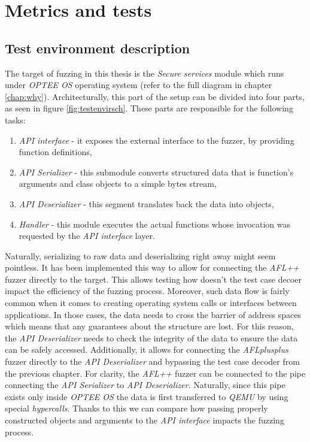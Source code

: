 \cleardoublepage
\section{Metrics and tests} \label{chap:tests}

\subsection{Test environment description}

The target of fuzzing in this thesis is the \textit{Secure services} module which runs under \textit{OPTEE OS} operating system (refer to the full diagram in chapter \ref{chap:why}). Architecturally, this part of the setup can be divided into four parts, as seen in figure \ref{fig:testenvirsch}. These parts are responsible for the following tasks:
\begin{enumerate}
    \item \textit{API interface} - it exposes the external interface to the fuzzer, by providing function definitions,
    \item \textit{API Serializer} - this submodule converts structured data that is function's arguments and class objects to a simple bytes stream,
    \item \textit{API Deserializer} - this segment translates back the data into objects,
    \item \textit{Handler} - this module executes the actual functions whose invocation was requested by the \textit{API interface} layer.
\end{enumerate}
Naturally, serializing to raw data and deserializing right away might seem pointless. It has been implemented this way to allow for connecting the \textit{AFL++} fuzzer directly to the target. This allows testing how doesn't the test case decoer impact the efficiency of the fuzzing process. 
Moreover, such data flow is fairly common when it comes to creating operating system calls or interfaces between applications. In those cases, the data needs to cross the barrier of address spaces which means that any guarantees about the structure are lost. For this reason, the \textit{API Deserializer} needs to check the integrity of the data to ensure the data can be safely accessed. Additionally, it allows for connecting the \textit{AFLplusplus} fuzzer directly to the \textit{API Deserializer} and bypassing the test case decoder from the previous chapter. For clarity, the \textit{AFL++} fuzzer can be connected to the pipe connecting the \textit{API Serializer} to \textit{API Deserializer}. Naturally, since this pipe exists only inside \textit{OPTEE OS} the data is first transferred to \textit{QEMU} by using special \textit{hypercalls}. Thanks to this we can compare how passing properly constructed objects and arguments to the \textit{API interface} impacts the fuzzing process.

